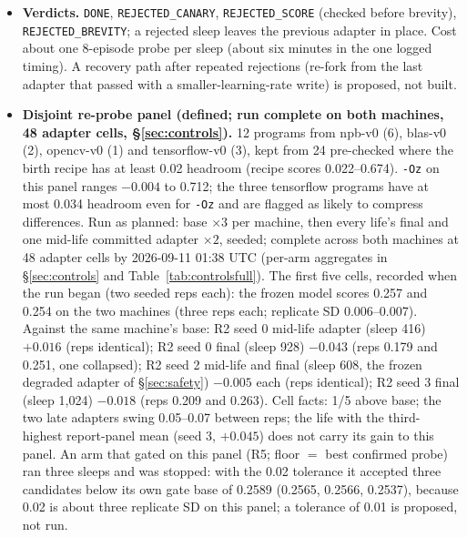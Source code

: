 \documentclass{article}
\begin{document}
\begin{itemize}
\item \textbf{Verdicts.} \texttt{DONE}, \texttt{REJECTED\_CANARY}, \texttt{REJECTED\_SCORE} (checked before brevity), \texttt{REJECTED\_BREVITY}; a rejected sleep leaves the previous adapter in place. Cost about one 8-episode probe per sleep (about six minutes in the one logged timing). A recovery path after repeated rejections (re-fork from the last adapter that passed with a smaller-learning-rate write) is proposed, not built.
\item \textbf{Disjoint re-probe panel (defined; run complete on both machines, 48 adapter cells, \S\ref{sec:controls}).}
12 programs from npb-v0 (6), blas-v0 (2), opencv-v0 (1) and tensorflow-v0 (3), kept from 24 pre-checked where the birth recipe has at least 0.02 headroom (recipe scores 0.022--0.674). \texttt{-Oz} on this panel ranges $-0.004$ to 0.712; the three tensorflow programs have at most 0.034 headroom even for \texttt{-Oz} and are flagged as likely to compress differences. Run as planned: base $\times 3$ per machine, then every life's final and one mid-life committed adapter $\times 2$, seeded; complete across both machines at 48 adapter cells by 2026-09-11 01:38 UTC (per-arm aggregates in \S\ref{sec:controls} and Table~\ref{tab:controlsfull}). The first five cells, recorded when the run began (two seeded reps each): the frozen model scores 0.257 and 0.254 on the two machines (three reps each; replicate SD 0.006--0.007). Against the same machine's base: R2 seed 0 mid-life adapter (sleep 416) $+0.016$ (reps identical); R2 seed 0 final (sleep 928) $-0.043$ (reps 0.179 and 0.251, one collapsed); R2 seed 2 mid-life and final (sleep 608, the frozen degraded adapter of \S\ref{sec:safety}) $-0.005$ each (reps identical); R2 seed 3 final (sleep 1{,}024) $-0.018$ (reps 0.209 and 0.263). Cell facts: 1/5 above base; the two late adapters swing 0.05--0.07 between reps; the life with the third-highest report-panel mean (seed 3, $+0.045$) does not carry its gain to this panel. An arm that gated on this panel (R5; floor $=$ best confirmed probe) ran three sleeps and was stopped: with the 0.02 tolerance it accepted three candidates below its own gate base of 0.2589 (0.2565, 0.2566, 0.2537), because 0.02 is about three replicate SD on this panel; a tolerance of 0.01 is proposed, not run.

\end{itemize}
\end{document}
